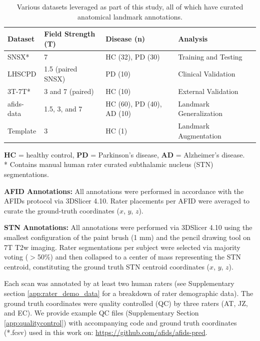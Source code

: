 \begin{table}[h!]
\centering
\caption{Various datasets leveraged as part of this study, all of which have curated anatomical landmark annotations.}
\begin{tabularx}{\textwidth}{l l l l l}
\toprule
\textbf{Dataset} & \textbf{Field Strength (T)} & \textbf{Disease (n)} & \textbf{Analysis} \\
\midrule
SNSX* & 7 & HC (32), PD (30) & Training and Testing  \\
LHSCPD & 1.5 (paired SNSX) & PD (10) & Clinical Validation \\
3T-7T* & 3 and 7 (paired) & HC (10) & External Validation  \\
afids-data & 1.5, 3, and 7 & HC (60), PD (40), AD (10) & Landmark Generalization \\
Template & 3 & HC (1) & Landmark Augmentation  \\
\bottomrule
\end{tabularx}

\vspace{1ex}
\raggedright
\footnotesize{
\textbf{HC} = healthy control, \textbf{PD} = Parkinson’s disease, \textbf{AD} = Alzheimer’s disease.\\
* Contains manual human rater curated subthalamic nucleus (STN) segmentations.
}
\label{tab:afidpred_datasets}
\end{table}

\textbf{AFID Annotations:} All annotations were performed in accordance with the AFIDs protocol via 3DSlicer 4.10. Rater placements per AFID were averaged to curate the ground-truth coordinates ($x$, $y$, $z$).

\textbf{STN Annotations:} All annotations were performed via 3DSlicer 4.10 \cite{Fedorov2012-rk} using the smallest configuration of the paint brush (1 mm) and the pencil drawing tool on 7T T2w imaging. Rater segmentations per subject were selected via majority voting (\(>\)50\%) and then collapsed to a center of mass representing the STN centroid, constituting the ground truth STN centroid coordinates ($x$, $y$, $z$).

Each scan was annotated by at least two human raters (see Supplementary section \ref{app:rater_demo_data} for a breakdown of rater demographic data). The ground truth coordinates were quality controlled (QC) by three raters (AT, JZ, and EC). We provide example QC files (Supplementary Section \ref{app:qualitycontrol}) with accompanying code and ground truth coordinates (*.fcsv) used in this work on: \url{https://github.com/afids/afids-pred}.

